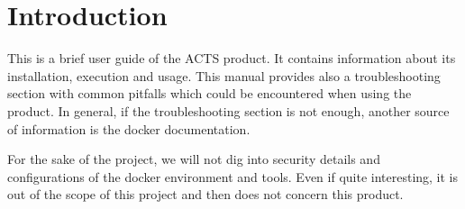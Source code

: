\section{Introduction}\label{intro}

This is a brief user guide of the ACTS product.
It contains information about
its installation, execution and usage.
This manual provides also a troubleshooting section with common
pitfalls which could be encountered when using the product.
In general, if the troubleshooting section is not enough,
another source of information is the docker documentation.

For the sake of the project, we will not dig into security details and
configurations of the docker environment and tools.
Even if quite interesting, it is out of the scope of this project and
then does not concern this product.
